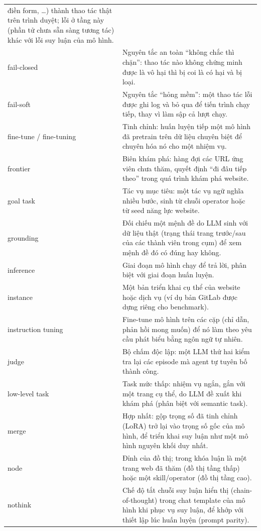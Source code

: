 \begin{longtable}{L{4.2cm} L{9.8cm}}
điền form, \dots) thành thao tác thật trên trình duyệt; lỗi ở tầng này
(phần tử chưa sẵn sàng tương tác) khác với lỗi suy luận của mô hình. \\
fail-closed & Nguyên tắc an toàn ``không chắc thì chặn'': thao tác nào không
chứng minh được là vô hại thì bị coi là có hại và bị loại. \\
fail-soft & Nguyên tắc ``hỏng mềm'': một thao tác lỗi được ghi log và bỏ qua
để tiến trình chạy tiếp, thay vì làm sập cả lượt chạy. \\
fine-tune / fine-tuning & Tinh chỉnh: huấn luyện tiếp một mô hình đã
pretrain trên dữ liệu chuyên biệt để chuyên hóa nó cho một nhiệm vụ. \\
frontier & Biên khám phá: hàng đợi các URL ứng viên chưa thăm, quyết định
``đi đâu tiếp theo'' trong quá trình khám phá website. \\
goal task & Tác vụ mục tiêu: một tác vụ ngữ nghĩa nhiều bước, sinh từ chuỗi operator hoặc từ seed năng lực website. \\
grounding & Đối chiếu một mệnh đề do LLM sinh với dữ liệu thật (trạng thái trang trước/sau của các thành viên trong cụm) để xem mệnh đề đó có đúng hay không. \\
inference & Giai đoạn mô hình chạy để trả lời, phân biệt với giai đoạn huấn
luyện. \\
instance & Một bản triển khai cụ thể của website hoặc dịch vụ (ví dụ bản
GitLab được dựng riêng cho benchmark). \\
instruction tuning & Fine-tune mô hình trên các cặp (chỉ dẫn, phản hồi mong
muốn) để nó làm theo yêu cầu phát biểu bằng ngôn ngữ tự nhiên. \\
judge & Bộ chấm độc lập: một LLM thứ hai kiểm tra lại các episode mà agent
tự tuyên bố thành công. \\
low-level task & Task mức thấp: nhiệm vụ ngắn, gắn với một trang cụ thể, do
LLM đề xuất khi khám phá (phân biệt với semantic task). \\
merge & Hợp nhất: gộp trọng số đã tinh chỉnh (LoRA) trở lại vào trọng số
gốc của mô hình, để triển khai suy luận như một mô hình nguyên khối duy nhất. \\
node & Đỉnh của đồ thị; trong khóa luận là một trang web đã thăm (đồ thị
tầng thấp) hoặc một skill/operator (đồ thị tầng cao). \\
nothink & Chế độ tắt chuỗi suy luận hiển thị (chain-of-thought) trong
chat template của mô hình khi phục vụ suy luận, để khớp với thiết lập lúc
huấn luyện (prompt parity). \\

\end{longtable}
